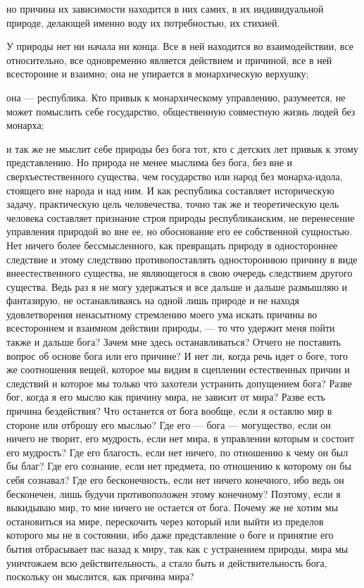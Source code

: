 \documentclass[12pt]{article}
\begin{document}
но причина их зависимости находится в них самих, в их индивидуальной природе, делающей именно воду их потребностью, их стихией. 

У природы нет ни начала ни конца. Все в ней находится во взаимодействии, все относительно, все одновременно является действием и причиной, все в ней всесторонне и взаимно; она не упирается в монархическую верхушку; 

она --- республика. Кто привык к монархическому управлению, разумеется, не может помыслить себе государство, общественную совместную жизнь людей без монарха; 

и так же не мыслит себе природы без бога тот, кто с детских лет привык к этому представлению. Но природа не менее мыслима без бога, без вне и сверхъестественного существа, чем государство или народ без монарха-идола, стоящего вне народа и над ним. И как республика составляет историческую задачу, практическую цель человечества, точно так же и теоретическую цель человека составляет признание строя природы республиканским, не перенесение управления природой во вне ее, но обоснование его ее собственной сущностью. Нет ничего более бессмысленного, как превращать природу в одностороннее следствие и этому следствию противопоставлять одностороннюю причину в виде внеестественного существа, не являющегося в свою очередь следствием другого существа. Ведь раз я не могу удержаться и все дальше и дальше размышляю и фантазирую, не останавливаясь на одной лишь природе и не находя удовлетворения ненасытному стремлению моего ума искать причины во всестороннем и взаимном действии природы, --- то что удержит меня пойти также и дальше бога? Зачем мне здесь останавливаться? Отчего не поставить вопрос об основе бога или его причине? И нет ли, когда речь идет о боге, того же соотношения вещей, которое мы видим в сцеплении естественных причин и следствий и которое мы только что захотели устранить допущением бога? Разве бог, когда я его мыслю как причину мира, не зависит от мира? Разве есть причина бездействия? Что останется от бога вообще, если я оставлю мир в стороне или отброшу его мыслью? Где его --- бога --- могущество, если он ничего не творит, его мудрость, если нет мира, в управлении которым и состоит его мудрость? Где его благость, если нет ничего, по отношению к чему он был бы благ? Где его сознание, если нет предмета, по отношению к которому он бы себя сознавал? Где его бесконечность, если нет ничего конечного, ибо ведь он бесконечен, лишь будучи противоположен этому конечному? Поэтому, если я выкидываю мир, то мне ничего не остается от бога. Почему же не хотим мы остановиться на мире, перескочить через который или выйти из пределов которого мы не в состоянии, ибо даже представление о боге и принятие его бытия отбрасывает пас назад к миру, так как с устранением природы, мира мы уничтожаем всю действительность, а стало быть и действительность бога, поскольку он мыслится, как причина мира? 
\end{document}
